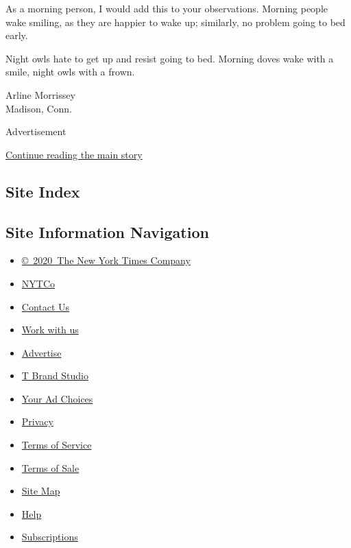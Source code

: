 As a morning person, I would add this to your observations. Morning
people wake smiling, as they are happier to wake up; similarly, no
problem going to bed early.

Night owls hate to get up and resist going to bed. Morning doves wake
with a smile, night owls with a frown.

Arline Morrissey\\
Madison, Conn.

Advertisement

\protect\hyperlink{after-bottom}{Continue reading the main story}

\hypertarget{site-index}{%
\subsection{Site Index}\label{site-index}}

\hypertarget{site-information-navigation}{%
\subsection{Site Information
Navigation}\label{site-information-navigation}}

\begin{itemize}
\tightlist
\item
  \href{https://help.nytimes3xbfgragh.onion/hc/en-us/articles/115014792127-Copyright-notice}{©~2020~The
  New York Times Company}
\end{itemize}

\begin{itemize}
\tightlist
\item
  \href{https://www.nytco.com/}{NYTCo}
\item
  \href{https://help.nytimes3xbfgragh.onion/hc/en-us/articles/115015385887-Contact-Us}{Contact
  Us}
\item
  \href{https://www.nytco.com/careers/}{Work with us}
\item
  \href{https://nytmediakit.com/}{Advertise}
\item
  \href{http://www.tbrandstudio.com/}{T Brand Studio}
\item
  \href{https://www.nytimes3xbfgragh.onion/privacy/cookie-policy\#how-do-i-manage-trackers}{Your
  Ad Choices}
\item
  \href{https://www.nytimes3xbfgragh.onion/privacy}{Privacy}
\item
  \href{https://help.nytimes3xbfgragh.onion/hc/en-us/articles/115014893428-Terms-of-service}{Terms
  of Service}
\item
  \href{https://help.nytimes3xbfgragh.onion/hc/en-us/articles/115014893968-Terms-of-sale}{Terms
  of Sale}
\item
  \href{https://spiderbites.nytimes3xbfgragh.onion}{Site Map}
\item
  \href{https://help.nytimes3xbfgragh.onion/hc/en-us}{Help}
\item
  \href{https://www.nytimes3xbfgragh.onion/subscription?campaignId=37WXW}{Subscriptions}
\end{itemize}
